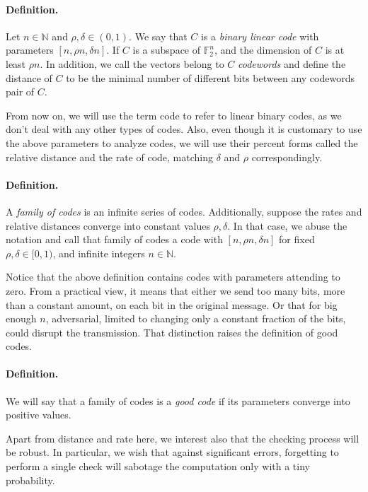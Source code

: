 \documentclass[sigplan,screen]{acmart}
\begin{document}
\begin{multicols*}{2}
  \paragraph{Definition.} Let $n \in \mathbb{N}$ and $\rho, \delta\in \left( 0,1 \right)$. We say that $C$ is a \textit{binary linear code} with parameters $[n, \rho n, \delta n]$. If $C$ is a subspace of $\mathbb{F}_{2}^{n}$, and the dimension of $C$ is at least $\rho n$. In addition, we call the vectors belong to $C$ \textit{codewords} and define the distance of $C$ to be the minimal number of different bits between any codewords pair of $C$.   

  From now on, we will use the term code to refer to linear binary codes, as we don't deal with any other types of codes. Also, even though it is customary to use the above parameters to analyze codes, we will use their percent forms called the relative distance and the rate of code, matching $\delta$ and $\rho$ correspondingly.     
  \paragraph{Definition.} A \textit{family of codes} is an infinite series of codes. Additionally, suppose the rates and relative distances converge into constant values $\rho,\delta$. In that case, we abuse the notation and call that family of codes a code with $[n, \rho n, \delta n]$ for fixed $\rho, \delta\in [ 0,1 )$, and infinite integers $n \in \mathbb{N}$.     

  Notice that the above definition contains codes with parameters attending to zero. From a practical view, it means that either we send too many bits, more than a constant amount, on each bit in the original message. Or that for big enough $n$, adversarial, limited to changing only a constant fraction of the bits, could disrupt the transmission. That distinction raises the definition of good codes.

  \paragraph{Definition.}We will say that a family of codes is a \textit{good code} if its parameters converge into positive values. 

  Apart from distance and rate here, we interest also that the checking process will be robust. In particular,  we wish that against significant errors, forgetting to perform a single check will sabotage the computation only with a tiny probability.  

\end{multicols*}
\end{document}
